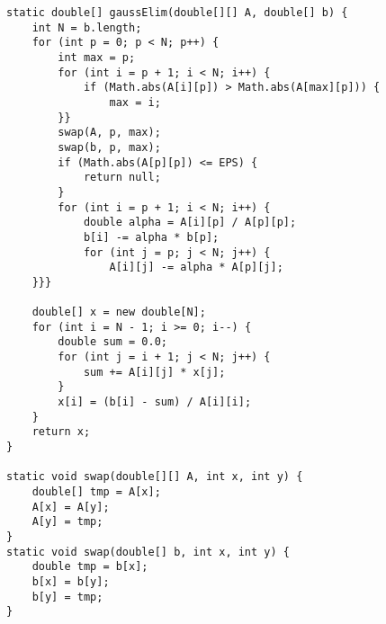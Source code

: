 \begin{verbatim}
static double[] gaussElim(double[][] A, double[] b) {
	int N = b.length;
	for (int p = 0; p < N; p++) {
		int max = p;
		for (int i = p + 1; i < N; i++) {
			if (Math.abs(A[i][p]) > Math.abs(A[max][p])) {
				max = i;
		}}
		swap(A, p, max);
		swap(b, p, max);
		if (Math.abs(A[p][p]) <= EPS) {
			return null;
		}
		for (int i = p + 1; i < N; i++) {
			double alpha = A[i][p] / A[p][p];
			b[i] -= alpha * b[p];
			for (int j = p; j < N; j++) {
				A[i][j] -= alpha * A[p][j];
	}}}

	double[] x = new double[N];
	for (int i = N - 1; i >= 0; i--) {
		double sum = 0.0;
		for (int j = i + 1; j < N; j++) {
			sum += A[i][j] * x[j];
		}
		x[i] = (b[i] - sum) / A[i][i];
	}
	return x;
}
	
static void swap(double[][] A, int x, int y) {
	double[] tmp = A[x];
	A[x] = A[y];
	A[y] = tmp;
}	
static void swap(double[] b, int x, int y) {
	double tmp = b[x];
	b[x] = b[y];
	b[y] = tmp;
}
\end{verbatim}